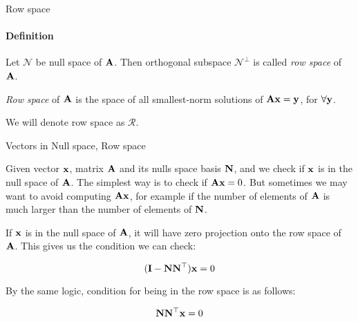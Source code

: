 \documentclass{beamer}
\begin{document}
\begin{frame}{Row space}
	\framesubtitle{Definition}
	\begin{flushleft}
		
		\begin{definition}
			Let $\mathcal{N}$ be null space of $\mathbf{A}$. Then orthogonal subspace $\mathcal{N}^\perp$ is called \emph{row space} of $\mathbf{A}$.
		\end{definition}
		
		\begin{definition}
			\emph{Row space} of $\mathbf{A}$ is the space of all smallest-norm solutions of $\mathbf{A}\mathbf{x} = \mathbf{y}$, for $\forall \mathbf{y}$.
		\end{definition}
		
		\bigskip
		
		We will denote row space as $\mathcal{R}$.
		
	\end{flushleft}
\end{frame}




\begin{frame}{Vectors in Null space, Row space}
	\begin{flushleft}
		
		Given vector $\mathbf{x}$, matrix $\mathbf{A}$ and its nulls space basis $\mathbf{N}$, and we check if $\mathbf{x}$ is in the null space of $\mathbf{A}$. The simplest way is to check if $\mathbf{A}\mathbf{x} = 0$. But sometimes we may want to avoid computing $\mathbf{A}\mathbf{x}$, for example if the number of elements of $\mathbf{A}$ is much larger than the number of elements of $\mathbf{N}$.
		
		\bigskip
		
		If $\mathbf{x}$ is in the null space of $\mathbf{A}$, it will have zero projection onto the row space of $\mathbf{A}$. This gives us the condition we can check:
		
		\begin{equation}
			(\mathbf{I} - \mathbf{N} \mathbf{N}^\top) \mathbf{x} = 0
		\end{equation}
		
		By the same logic, condition for being in the row space is as follows:
		
		\begin{equation}
			\mathbf{N} \mathbf{N}^\top \mathbf{x} = 0
		\end{equation}
		
		
	\end{flushleft}
\end{frame}
\end{document}
